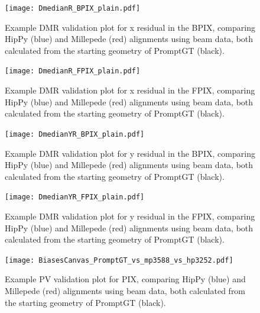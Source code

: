 \begin{figure}[!hbt]
    \begin{center}
        \texttt{[image: DmedianR\_BPIX\_plain.pdf]}
        \caption{Example DMR validation plot for x residual in the BPIX, comparing HipPy (blue) and Millepede (red) alignments using beam data, both calculated from the starting geometry of PromptGT (black).}
        \label{fig:DmedianR_BPIX_plain}
    \end{center}
\end{figure}
\begin{figure}[!hbt]
    \begin{center}
        \texttt{[image: DmedianR\_FPIX\_plain.pdf]}
        \caption{Example DMR validation plot for x residual in the FPIX, comparing HipPy (blue) and Millepede (red) alignments using beam data, both calculated from the starting geometry of PromptGT (black).}
        \label{fig:DmedianR_FPIX_plain}
    \end{center}
\end{figure}
\begin{figure}[!hbt]
    \begin{center}
        \texttt{[image: DmedianYR\_BPIX\_plain.pdf]}
        \caption{Example DMR validation plot for y residual in the BPIX, comparing HipPy (blue) and Millepede (red) alignments using beam data, both calculated from the starting geometry of PromptGT (black).}
        \label{fig:DmedianYR_BPIX_plain}
    \end{center}
\end{figure}
\begin{figure}[!hbt]
    \begin{center}
        \texttt{[image: DmedianYR\_FPIX\_plain.pdf]}
        \caption{Example DMR validation plot for y residual in the FPIX, comparing HipPy (blue) and Millepede (red) alignments using beam data, both calculated from the starting geometry of PromptGT (black).}
        \label{fig:DmedianYR_FPIX_plain}
    \end{center}
\end{figure}
\begin{figure}[!hbt]
    \begin{center}
        \texttt{[image: BiasesCanvas\_PromptGT\_vs\_mp3588\_vs\_hp3252.pdf]}
        \caption{Example PV validation plot for PIX, comparing HipPy (blue) and Millepede (red) alignments using beam data, both calculated from the starting geometry of PromptGT (black).}
        \label{fig:BiasesCanvas_PromptGT_vs_mp3588_vs_hp3252}
    \end{center}
\end{figure}
